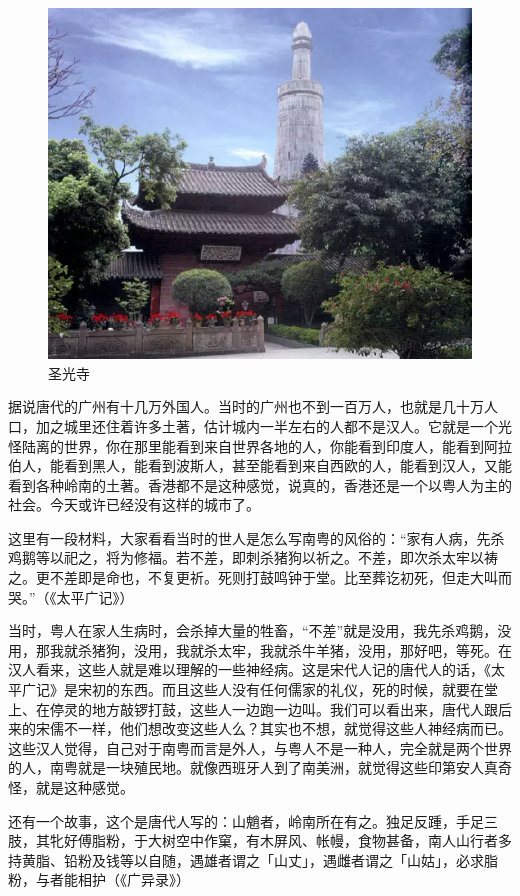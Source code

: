 \begin{figure}
	\centering
	\includegraphics[width=\textwidth]{images/image-28}
	\caption{圣光寺}
\end{figure}

据说唐代的广州有十几万外国人。当时的广州也不到一百万人，也就是几十万人口，加之城里还住着许多土著，估计城内一半左右的人都不是汉人。它就是一个光怪陆离的世界，你在那里能看到来自世界各地的人，你能看到印度人，能看到阿拉伯人，能看到黑人，能看到波斯人，甚至能看到来自西欧的人，能看到汉人，又能看到各种岭南的土著。香港都不是这种感觉，说真的，香港还是一个以粤人为主的社会。今天或许已经没有这样的城市了。

这里有一段材料，大家看看当时的世人是怎么写南粤的风俗的：“家有人病，先杀鸡鹅等以祀之，将为修福。若不差，即刺杀猪狗以祈之。不差，即次杀太牢以祷之。更不差即是命也，不复更祈。死则打鼓鸣钟于堂。比至葬讫初死，但走大叫而哭。”（《太平广记》）

当时，粤人在家人生病时，会杀掉大量的牲畜，“不差”就是没用，我先杀鸡鹅，没用，那我就杀猪狗，没用，我就杀太牢，我就杀牛羊猪，没用，那好吧，等死。在汉人看来，这些人就是难以理解的一些神经病。这是宋代人记的唐代人的话，《太平广记》是宋初的东西。而且这些人没有任何儒家的礼仪，死的时候，就要在堂上、在停灵的地方敲锣打鼓，这些人一边跑一边叫。我们可以看出来，唐代人跟后来的宋儒不一样，他们想改变这些人么？其实也不想，就觉得这些人神经病而已。这些汉人觉得，自己对于南粤而言是外人，与粤人不是一种人，完全就是两个世界的人，南粤就是一块殖民地。就像西班牙人到了南美洲，就觉得这些印第安人真奇怪，就是这种感觉。

还有一个故事，这个是唐代人写的：山魈者，岭南所在有之。独足反踵，手足三肢，其牝好傅脂粉，于大树空中作窠，有木屏风、帐幔，食物甚备，南人山行者多持黄脂、铅粉及钱等以自随，遇雄者谓之「山丈」，遇雌者谓之「山姑」，必求脂粉，与者能相护（《广异录》）

